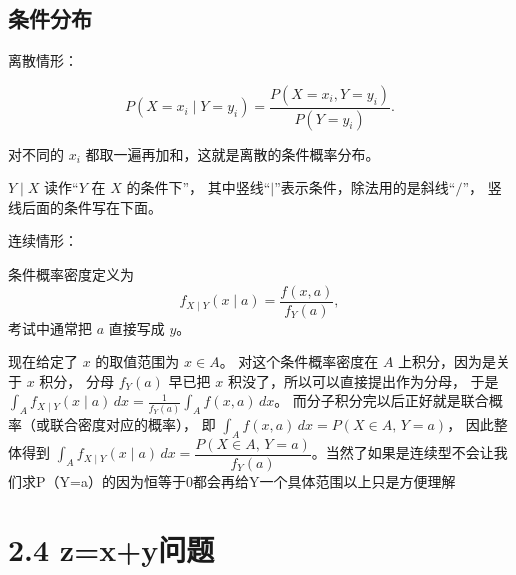 \subsection*{条件分布}
\begin{note}
    离散情形：

\[
P(X=x_i\mid Y=y_i)
= \frac{P(X=x_i,Y=y_i)}{P(Y=y_i)}.
\]

对不同的 $x_i$ 都取一遍再加和，这就是离散的条件概率分布。

$Y\mid X$ 读作“$Y$ 在 $X$ 的条件下”，
其中竖线“$\mid$”表示条件，除法用的是斜线“$/ $”，
竖线后面的条件写在下面。

连续情形：

条件概率密度定义为
\[
f_{X\mid Y}(x\mid a)=\frac{f(x,a)}{f_Y(a)},
\]
考试中通常把 $a$ 直接写成 $y$。

现在给定了 $x$ 的取值范围为 $x\in A$。
对这个条件概率密度在 $A$ 上积分，因为是关于 $x$ 积分，
分母 $f_Y(a)$ 早已把 $x$ 积没了，所以可以直接提出作为分母，
于是
$\int_A f_{X\mid Y}(x\mid a)\,dx
=\frac{1}{f_Y(a)}\int_A f(x,a)\,dx$。
而分子积分完以后正好就是联合概率（或联合密度对应的概率），
即
$\int_A f(x,a)\,dx=P(X\in A,\,Y=a)$，
因此整体得到
$\int_A f_{X\mid Y}(x\mid a)\,dx
=\dfrac{P(X\in A,\,Y=a)}{f_Y(a)}$。当然了如果是连续型不会让我们求P（Y=a）的因为恒等于0都会再给Y一个具体范围以上只是方便理解
\end{note}

\section{2.4 z=x+y问题}

